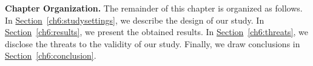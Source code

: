 \noindent \textbf{Chapter Organization.} The remainder of this chapter is
organized as follows. In
\hyperref[ch6:studysettings]{Section}~\ref{ch6:studysettings}, we describe the
design of our study. In \hyperref[ch6:results]{Section}~\ref{ch6:results}, we
present the obtained results. In
\hyperref[ch6:threats]{Section}~\ref{ch6:threats}, we disclose the threats to
the validity of our study. Finally, we draw conclusions in
\hyperref[ch6:conclusion]{Section}~\ref{ch6:conclusion}. 

